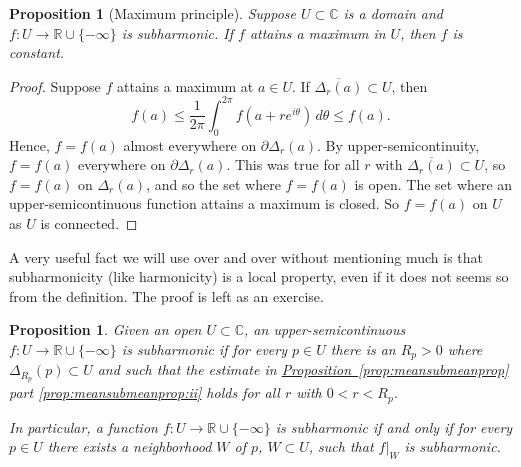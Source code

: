 \documentclass[12pt,openany]{book}
\newcommand{\C}{{\mathbb{C}}}
\newcommand{\R}{{\mathbb{R}}}
\theoremstyle{plain}
\newtheorem{prop}[thm]{Proposition}
\theoremstyle{remark}
\theoremstyle{definition}
\theoremstyle{exercise}
\theoremstyle{example}
\newcommand{\propref}[1]{\hyperref[#1]{Proposition~\ref*{#1}}}
\begin{document}
\begin{prop}[Maximum principle]
Suppose $U \subset \C$ is a domain and $f \colon U \to \R \cup \{ -\infty \}$
is subharmonic.  If $f$ attains a maximum in $U$, then $f$ is constant.
\end{prop}

\begin{proof}
Suppose $f$ attains a maximum at $a \in U$.
If
$\overline{\Delta_r(a)} \subset U$, then
\begin{equation*}
f(a) \leq \frac{1}{2\pi} \int_0^{2\pi} f(a+re^{i\theta})\, d\theta \leq f(a)
.
\end{equation*}
Hence, $f = f(a)$ almost everywhere on $\partial \Delta_r(a)$.
By upper-semicontinuity, $f = f(a)$ everywhere on $\partial \Delta_r(a)$.
This was true for all $r$
with $\overline{\Delta_r(a)} \subset U$, so $f=f(a)$ on $\Delta_r(a)$,
and so the set where $f=f(a)$ is open.  The set where an upper-semicontinuous
function attains a maximum is closed.  So $f=f(a)$ on $U$ as $U$ is
connected.
\end{proof}

A very useful fact we will use over and over without mentioning much is that subharmonicity
(like harmonicity)
is a local property,
even if it does not seems so from the definition.
The proof is left as an exercise.

\begin{prop} \label{prop:shlocal}
Given an open
$U \subset \C$, an upper-semicontinuous $f \colon U \to \R \cup \{ -\infty \}$
is subharmonic if
for every $p \in U$ there is an $R_p > 0$ where $\Delta_{R_p}(p) \subset U$ 
and such that the estimate in
\propref{prop:meansubmeanprop} part \ref{prop:meansubmeanprop:ii}
holds for all $r$ with $0 < r < R_p$.

In particular,
a function $f \colon U \to \R \cup \{ -\infty \}$ is subharmonic if
and only if for every $p \in U$ there exists a neighborhood $W$ of $p$,
$W \subset U$, such that $f|_{W}$ is subharmonic.
\end{prop}
\end{document}
